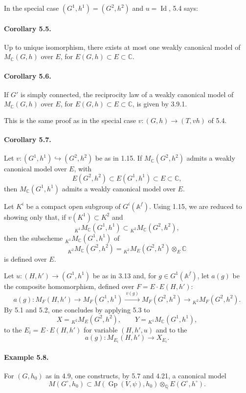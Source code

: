 \documentclass[10pt]{article}
\newcommand{\Af}{\mathbb A^f}
\newcommand{\C}{\mathbb C}
\newcommand{\Q}{\mathbb Q}
\newcommand{\Gp}{\operatorname{Gp}}
\newcommand{\MC}{M_{\C}}
\newcommand{\Id}{\operatorname{Id}}
\begin{document}
In the special case $(G^1,h^1)=(G^2,h^2)$ and $u=\Id$, 5.4 says:

\paragraph{Corollary 5.5.} Up to unique isomorphism, there exists at most one weakly canonical model of $\MC(G,h)$ over $E$, for $E(G,h)\subset E\subset\C$.

\paragraph{Corollary 5.6.} If $G'$ is simply connected, the reciprocity law of a weakly canonical model of $\MC(G,h)$ over $E$, for $E(G,h)\subset E\subset\C$, is given by 3.9.1.

This is the same proof as in the special case $v:(G,h)\to(T,vh)$ of 5.4.

\paragraph{Corollary 5.7.} Let $v:(G^1,h^1)\hookrightarrow(G^2,h^2)$ be as in 1.15. If $\MC(G^2,h^2)$ admits a weakly canonical model over $E$, with
\[
E(G^2,h^2)\subset E(G^1,h^1)\subset E\subset\C,
\]
then $\MC(G^1,h^1)$ admits a weakly canonical model over $E$.

Let $K^i$ be a compact open subgroup of $G^i(\Af)$. Using 1.15, we are reduced to showing only that, if $v(K^1)\subset K^2$ and
\[
{}_{K^1}\MC(G^1,h^1)\subset{}_{K^2}\MC(G^2,h^2),
\]
then the subscheme ${}_{K^1}\MC(G^1,h^1)$ of
\[
{}_{K^2}\MC(G^2,h^2)={}_{K^2}M_E(G^2,h^2)\otimes_E\C
\]
is defined over $E$.

Let $u:(H,h')\to(G^1,h^1)$ be as in 3.13 and, for $g\in G^1(\Af)$, let $a(g)$ be the composite homomorphism, defined over $F=E\cdot E(H,h')$:
\[
a(g):M_F(H,h')\longrightarrow M_F(G^1,h^1)
 \xrightarrow{\ v(g)\ } M_F(G^2,h^2)
 \longrightarrow{}_{K^2}M_F(G^2,h^2).
\]
By 5.1 and 5.2, one concludes by applying 5.3 to
\[
X={}_{K^2}M_E(G^2,h^2),\qquad
Y={}_{K^1}\MC(G^1,h^1),
\]
to the $E_i=E\cdot E(H,h')$ for variable $(H,h',u)$ and to the
\[
a(g):M_{E_i}(H,h')\longrightarrow X_{E_i}.
\]

\paragraph{Example 5.8.} For $(G,h_0)$ as in 4.9, one constructs, by 5.7 and 4.21, a canonical model
\[
M(G^\circ,h_0)\subset M(\Gp(V,\psi),h_0)\otimes_{\Q}E(G^\circ,h^\circ).
\]
\end{document}
